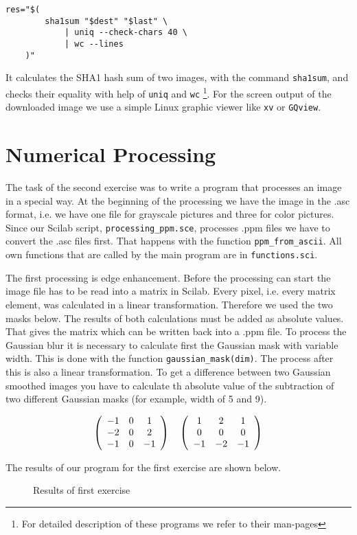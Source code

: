 \documentclass[a4paper,english,11pt,oneside]{article}
\begin{document}
\begin{lstlisting}
res="$(
		sha1sum "$dest" "$last" \
			| uniq --check-chars 40 \
			| wc --lines
	)"
\end{lstlisting}

It calculates the SHA1 hash sum of two images, with the command \lstinline&sha1sum&, and checks their equality with help of \lstinline&uniq& and \lstinline&wc& \footnote{For detailed description of these programs we refer to their man-pages}.
For the screen output of the downloaded image we use a simple Linux graphic viewer like \lstinline&xv& or \lstinline&GQview&.

\section{Numerical Processing}
The task of the second exercise was to write a program that processes an image in a special way. At the beginning of the processing we have the image in the .asc format, i.e. we have one file for grayscale pictures and three for color pictures. Since our Scilab script, \lstinline&processing_ppm.sce&, processes .ppm files we have to convert the .asc files first. That happens with the function \lstinline&ppm_from_ascii&. All own functions that are called by the main program are in \lstinline&functions.sci&.

The first processing is edge enhancement. Before the processing can start the image file has to be read into a matrix in Scilab. Every pixel, i.e. every matrix element, was calculated in a linear transformation. Therefore we used the two masks below. The results of both calculations must be added as absolute values. That gives the matrix which can be written back into a .ppm file. To process the Gaussian blur it is necessary to calculate first the Gaussian mask with variable width. This is done with the function \lstinline&gaussian_mask(dim)&. The process after this is also a linear transformation. To get a difference between two Gaussian smoothed images you have to calculate th absolute value of the subtraction of two different Gaussian masks (for example, width of 5 and 9).

	\[
	\left(
\begin{array}[l]{ccc}
	-1 & 0 & 1 \\
	-2 & 0 & 2 \\
	-1 & 0 & -1 \\	
\end{array}
\right)
\quad
\left(
\begin{array}[r]{ccc}
	1 & 2 & 1 \\
	0 & 0 & 0 \\
	-1 & -2 & -1 \\	
\end{array}
\right)
\]

The results of our program for the first exercise are shown below.

\begin{figure}[htbp]
	\centering
	\label{ex1}
	\caption{Results of first exercise}
\end{figure}
\end{document}
